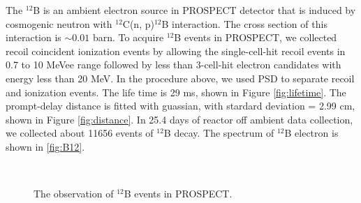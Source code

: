 The $^{12}$B is an ambient electron source in PROSPECT detector that is induced by cosmogenic neutron with $^{12}$C(n, p)$^{12}$B interaction. The cross section of this interaction is $\sim 0.01$ barn. To acquire $^{12}$B events in PROSPECT, we collected recoil coincident ionization events by allowing the single-cell-hit recoil events in 0.7 to 10 MeVee range followed by less than 3-cell-hit electron candidates with energy less than 20 MeV. In the procedure above, we used PSD to separate recoil and ionization events. The life time is 29 ms, shown in Figure \ref{fig:lifetime}. The prompt-delay distance is fitted with guassian, with stardard deviation = 2.99 cm, shown in Figure \ref{fig:distance}. In 25.4 days of reactor off ambient data collection, we collected about 11656 events of $^{12}$B decay. The spectrum of $^{12}$B electron is shown in \ref{fig:B12}.
\begin{figure}[h!]
\centering
{}\quad
{} \\
\caption{The observation of $^{12}$B events in PROSPECT.}
\label{fig:B12plots}
\end{figure}


